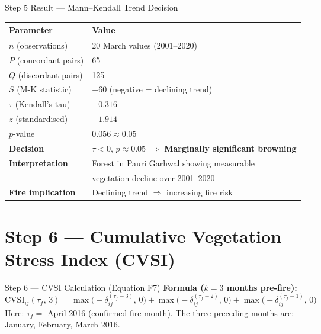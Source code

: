 \documentclass[12pt, a4paper]{article}
\begin{document}
\begin{interpretbox}{Step 5 Result --- Mann--Kendall Trend Decision}
\begin{center}
\begin{tabular}{ll}
\toprule
\textbf{Parameter} & \textbf{Value} \\
\midrule
$n$ (observations)        & 20 March values (2001--2020) \\
$P$ (concordant pairs)    & 65 \\
$Q$ (discordant pairs)    & 125 \\
$S$ (M-K statistic)       & $-60$ (negative = declining trend) \\
$\tau$ (Kendall's tau)    & $-0.316$ \\
$z$ (standardised)        & $-1.914$ \\
$p$-value                 & $0.056 \approx 0.05$ \\
\midrule
\textbf{Decision} &
$\tau < 0$, $p \approx 0.05$ $\Rightarrow$ \textbf{Marginally significant browning} \\
\textbf{Interpretation} & Forest in Pauri Garhwal showing measurable \\
 & vegetation decline over 2001--2020 \\
\textbf{Fire implication} & Declining trend $\Rightarrow$ increasing fire risk \\
\bottomrule
\end{tabular}
\end{center}
\end{interpretbox}

\section{Step 6 --- Cumulative Vegetation Stress Index (CVSI)}
\label{sec:step6}

\begin{stepbox}{Step 6 --- CVSI Calculation (Equation F7)}
\textbf{Formula ($k = 3$ months pre-fire):}
\begin{equation}
  \mathrm{CVSI}_{ij}(\tau_f,\,3) =
  \max\!\bigl(-\delta_{ij}^{(\tau_f - 3)},\,0\bigr) +
  \max\!\bigl(-\delta_{ij}^{(\tau_f - 2)},\,0\bigr) +
  \max\!\bigl(-\delta_{ij}^{(\tau_f - 1)},\,0\bigr)
  \tag{F7}
\end{equation}
Here: $\tau_f = $ April 2016 (confirmed fire month).
The three preceding months are: January, February, March 2016.
\end{stepbox}
\end{document}
